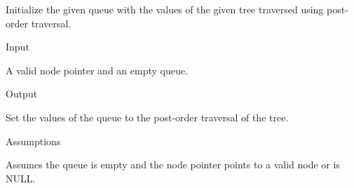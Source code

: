 \documentclass[pdftex, 12pt]{article}
\begin{document}
\begin{description}
\begin{description}
			Initialize the given queue with the values of the given tree traversed using post-order traversal.

		\item{Input}

			A valid node pointer and an empty queue.

		\item{Output}

			Set the values of the queue to the post-order traversal of the tree.

		\item{Assumptions}

			Assumes the queue is empty and the node pointer points to a valid node or is NULL.

		\end{description}

\end{description}
\end{document}
